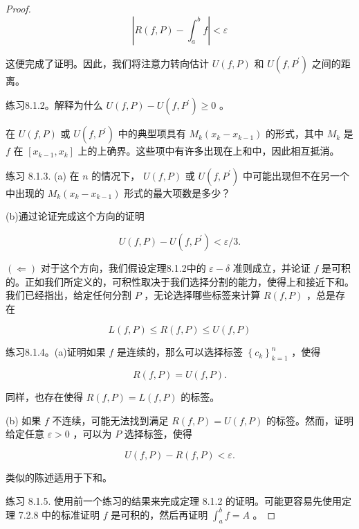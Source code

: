 \begin{proof}
\[
\left| {R\left( {f,P}\right)  - {\int }_{a}^{b}f}\right|  < \varepsilon
\]

这便完成了证明。因此，我们将注意力转向估计 \(U\left( {f,P}\right)\) 和 \(U\left( {f,{P}^{\prime }}\right)\) 之间的距离。

练习8.1.2。解释为什么 \(U\left( {f,P}\right)  - U\left( {f,{P}^{\prime }}\right)  \geq  0\) 。

在 \(U\left( {f,P}\right)\) 或 \(U\left( {f,{P}^{\prime }}\right)\) 中的典型项具有 \({M}_{k}\left( {{x}_{k} - {x}_{k - 1}}\right)\) 的形式，其中 \({M}_{k}\) 是 \(f\) 在 \(\left\lbrack  {{x}_{k - 1},{x}_{k}}\right\rbrack\) 上的上确界。这些项中有许多出现在上和中，因此相互抵消。

练习 8.1.3. (a) 在 \(n\) 的情况下， \(U\left( {f,P}\right)\) 或 \(U\left( {f,{P}^{\prime }}\right)\) 中可能出现但不在另一个中出现的 \({M}_{k}\left( {{x}_{k} - {x}_{k - 1}}\right)\) 形式的最大项数是多少？

(b)通过论证完成这个方向的证明

\[
U\left( {f,P}\right)  - U\left( {f,{P}^{\prime }}\right)  < \varepsilon /3.
\]

\(\left(  \Leftarrow  \right)\) 对于这个方向，我们假设定理8.1.2中的 \(\varepsilon  - \delta\) 准则成立，并论证 \(f\) 是可积的。正如我们所定义的，可积性取决于我们选择分割的能力，使得上和接近下和。我们已经指出，给定任何分割 \(P\) ，无论选择哪些标签来计算 \(R\left( {f,P}\right)\) ，总是存在

\[
L\left( {f,P}\right)  \leq  R\left( {f,P}\right)  \leq  U\left( {f,P}\right)
\]



练习8.1.4。(a)证明如果 \(f\) 是连续的，那么可以选择标签 \({\left\{  {c}_{k}\right\}  }_{k = 1}^{n}\) ，使得

\[
R\left( {f,P}\right)  = U\left( {f,P}\right) .
\]

同样，也存在使得 \(R\left( {f,P}\right)  = L\left( {f,P}\right)\) 的标签。

(b) 如果 \(f\) 不连续，可能无法找到满足 \(R\left( {f,P}\right)  = U\left( {f,P}\right)\) 的标签。然而，证明给定任意 \(\varepsilon  > 0\) ，可以为 \(P\) 选择标签，使得

\[
U\left( {f,P}\right)  - R\left( {f,P}\right)  < \varepsilon .
\]

类似的陈述适用于下和。

练习 8.1.5. 使用前一个练习的结果来完成定理 8.1.2 的证明。可能更容易先使用定理 7.2.8 中的标准证明 \(f\) 是可积的，然后再证明 \({\int }_{a}^{b}f = A\) 。
  
\end{proof}

